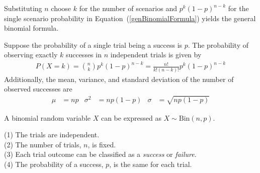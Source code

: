 Substituting $n$ choose $k$ for the number of scenarios and $p^k(1-p)^{n-k}$ for the single scenario probability in Equation~(\ref{genBinomialFormula}) yields the general binomial formula. 

\begin{termBox}{ Suppose the probability of a single trial being a success is $p$. The probability of observing exactly $k$ successes in $n$ independent trials is given by\vspace{-1mm}
		\begin{eqnarray}
		P(X = k) = {n\choose k}p^k(1-p)^{n-k} = \frac{n!}{k!(n-k)!}p^k(1-p)^{n-k}
		\label{binomialFormula}
		\end{eqnarray}
		Additionally, the mean, variance, and standard deviation of the number of observed successes are\vspace{-2mm}
		\begin{align}
		\mu &= np
		&\sigma^2 &= np(1-p)
		&\sigma &= \sqrt{np(1-p)}
		\label{binomialStats}
		\end{align}
		
		A binomial random variable $X$ can be expressed as $X \sim \textrm{Bin}(n, p)$.}
\end{termBox}


\begin{tipBox}{
		(1) The trials are independent. \\
		(2) The number of trials, $n$, is fixed. \\
		(3) Each trial outcome can be classified as a \emph{success} or \emph{failure}. \\
		(4) The probability of a success, $p$, is the same for each trial.}
\end{tipBox}

